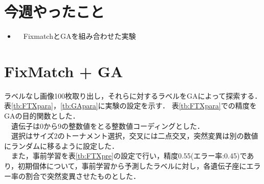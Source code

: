 \documentclass[twocolumn]{jarticle}     %
\begin{document}


\section{今週やったこと}

\begin{itemize}
	\item　FixmatchとGAを組み合わせた実験
\end{itemize}

\section{FixMatch + GA}
ラベルなし画像100枚取り出し，それらに対するラベルをGAによって探索する．
表\ref{tb:FTXpara}，\ref{tb:GApara}に実験の設定を示す．
表\ref{tb:FTXpara}での精度をGAの目的関数とした．\\
　遺伝子は0から9の整数値をとる整数値コーディングとした．\\
　選択はサイズ2のトーナメント選択，交叉には二点交叉，突然変異は別の数値にランダムに移るように設定した．\\
　また，事前学習を表\ref{tb:FTXpre}の設定で行い，精度0.55(エラー率:0.45)であり，初期個体について，事前学習から予測したラベルに対し，各遺伝子座にエラー率の割合で突然変異させたものとした．
\begin{table}[h]
	\centering
	\caption{FixMatchの設定\label{tb:FTXpara}}
\end{table}
\end{document}
